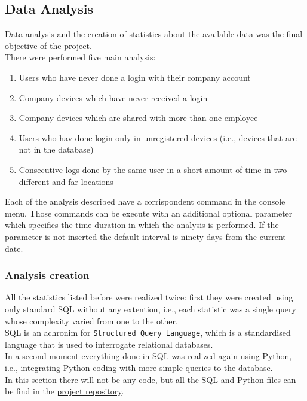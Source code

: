 \documentclass[12pt, a4paper, oneside]{article}
\begin{document}
\subsection{Data Analysis}
Data analysis and the creation of statistics about the available data was the final objective of the project.\\
There were performed five main analysis:
\begin{enumerate}
    \item Users who have never done a login with their company account
    \item Company devices which have never received a login
    \item Company devices which are shared with more than one employee
    \item Users who hav done login only in unregistered devices (i.e., devices that are not in the database)
    \item Consecutive logs done by the same user in a short amount of time in two different and far locations 
\end{enumerate}
\newpage
Each of the analysis described have a corrispondent command in the console menu. Those commands can be execute with an additional optional parameter which specifies the time duration in which the analysis is performed.
If the parameter is not inserted the default interval is ninety days from the current date. 

\subsubsection{Analysis creation}
All the statistics listed before were realized twice: first they were created using only standard SQL without any extention, i.e., each statistic was a single query whose complexity varied from one to the other.\\
SQL is an achronim for \texttt{Structured Query Language}, which is a standardised language that is used to interrogate relational databases.\\
In a second moment everything done in SQL was realized again using Python, i.e., integrating Python coding with more simple queries to the database.\\
In this section there will not be any code, but all the SQL and Python files can be find in the \href{https:\\github.com}{project repository}.
\end{document}
